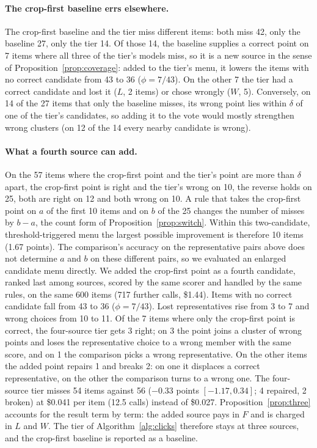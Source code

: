 \paragraph{The crop-first baseline errs elsewhere.} The crop-first baseline and the tier miss different items: both miss 42, only the baseline 27, only the tier 14. Of those 14, the baseline supplies a correct point on 7 items where all three of the tier's models miss, so it is a new source in the sense of Proposition~\ref{prop:coverage}: added to the tier's menu, it lowers the items with no correct candidate from 43 to 36 ($\phi=7/43$). On the other 7 the tier had a correct candidate and lost it ($L$, 2 items) or chose wrongly ($W$, 5). Conversely, on 14 of the 27 items that only the baseline misses, its wrong point lies within $\delta$ of one of the tier's candidates, so adding it to the vote would mostly strengthen wrong clusters (on 12 of the 14 every nearby candidate is wrong).

\paragraph{What a fourth source can add.} On the 57 items where the crop-first point and the tier's point are more than $\delta$ apart, the crop-first point is right and the tier's wrong on 10, the reverse holds on 25, both are right on 12 and both wrong on 10. A rule that takes the crop-first point on $a$ of the first 10 items and on $b$ of the 25 changes the number of misses by $b-a$, the count form of Proposition~\ref{prop:switch}. Within this two-candidate, threshold-triggered menu the largest possible improvement is therefore 10 items (1.67 points). The comparison's accuracy on the representative pairs above does not determine $a$ and $b$ on these different pairs, so we evaluated an enlarged candidate menu directly. We added the crop-first point as a fourth candidate, ranked last among sources, scored by the same scorer and handled by the same rules, on the same 600 items (717 further calls, \$1.44). Items with no correct candidate fall from 43 to 36 ($\phi=7/43$). Lost representatives rise from 3 to 7 and wrong choices from 10 to 11. Of the 7 items where only the crop-first point is correct, the four-source tier gets 3 right; on 3 the point joins a cluster of wrong points and loses the representative choice to a wrong member with the same score, and on 1 the comparison picks a wrong representative. On the other items the added point repairs 1 and breaks 2: on one it displaces a correct representative, on the other the comparison turns to a wrong one. The four-source tier misses 54 items against 56 ($-0.33$ points $[-1.17,0.34]$; 4 repaired, 2 broken) at \$0.041 per item (12.5 calls) instead of \$0.027. Proposition~\ref{prop:three} accounts for the result term by term: the added source pays in $F$ and is charged in $L$ and $W$. The tier of Algorithm~\ref{alg:clicks} therefore stays at three sources, and the crop-first baseline is reported as a baseline.


